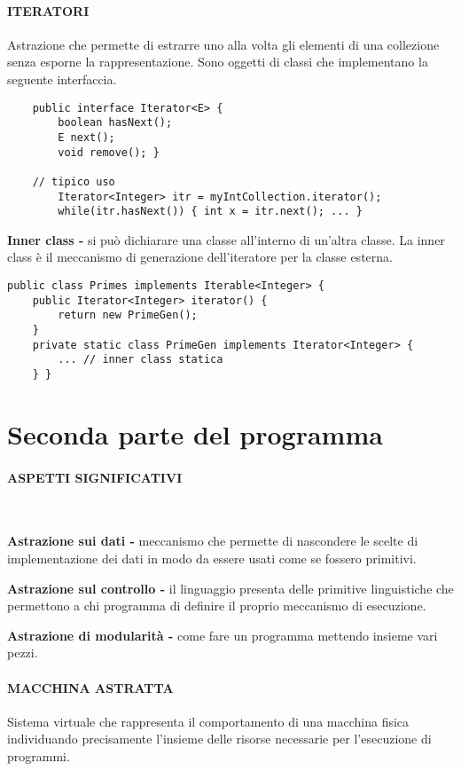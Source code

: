 \documentclass[a4paper, 12pt]{article}
\begin{document}
\paragraph{ITERATORI}
Astrazione che permette di estrarre uno alla volta gli elementi di una collezione senza
esporne la rappresentazione. Sono oggetti di classi che implementano la seguente
interfaccia.
\begin{lstlisting}
    public interface Iterator<E> {
        boolean hasNext();
        E next();
        void remove(); }
    
    // tipico uso
        Iterator<Integer> itr = myIntCollection.iterator();
        while(itr.hasNext()) { int x = itr.next(); ... }
\end{lstlisting}
\textbf{Inner class -} si può dichiarare una classe all'interno di un'altra classe. La 
inner class è il meccanismo di generazione dell'iteratore per la classe esterna.
\begin{lstlisting}
public class Primes implements Iterable<Integer> {
    public Iterator<Integer> iterator() {
        return new PrimeGen();
    }
    private static class PrimeGen implements Iterator<Integer> {
        ... // inner class statica
    } }
\end{lstlisting}

\section{Seconda parte del programma}
\paragraph{ASPETTI SIGNIFICATIVI} \

\textbf{Astrazione sui dati -} meccanismo che permette di nascondere le scelte di 
implementazione dei dati in modo da essere usati come se fossero primitivi.

\textbf{Astrazione sul controllo -} il linguaggio presenta delle primitive linguistiche
che permettono a chi programma di definire il proprio meccanismo di esecuzione.

\textbf{Astrazione di modularità -} come fare un programma mettendo insieme vari pezzi.

\paragraph{MACCHINA ASTRATTA} 
Sistema virtuale che rappresenta il comportamento di una macchina fisica individuando
precisamente l'insieme delle risorse necessarie per l'esecuzione di programmi.
\end{document}
